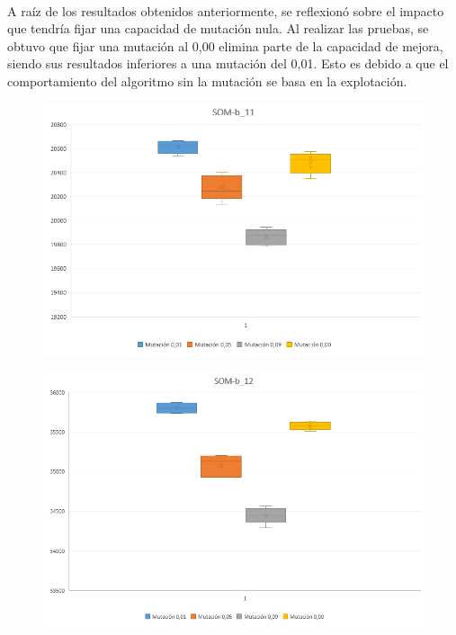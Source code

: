 	\paragraph{}A raíz de los resultados obtenidos anteriormente, se reflexionó sobre el impacto que tendría fijar una capacidad de mutación nula. Al realizar las pruebas, se obtuvo que fijar una mutación al 0,00 elimina parte de la capacidad de mejora, siendo sus resultados inferiores a una mutación del 0,01. Esto es debido a que el comportamiento del algoritmo sin la mutación se basa en la explotación.
	
	\begin{figure}[H]
		
		\centering
		\includegraphics[scale=0.7]{img/BigotesMutacion0_SOM_1}
	\end{figure}
	\begin{figure}[H]
		
		\centering
		\includegraphics[scale=0.7]{img/BigotesMutacion0_SOM_2}
		
	\end{figure}
